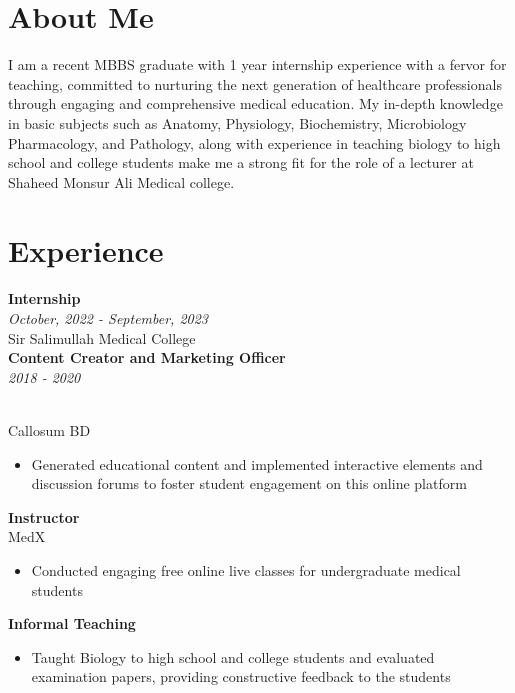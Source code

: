 \documentclass[a4paper,11pt]{article}
\newcommand{\resumeentry}[2]{
    \textbf{#1} \\
    \textit{#2}
}
\begin{document}
\begin{minipage}[t][12cm]{0.33\textwidth}
\end{minipage}
\hspace{1cm}
\begin{minipage}[t][12cm]{0.6\textwidth}
\section*{About Me}
  I am a recent MBBS graduate with 1 year internship experience with a fervor for teaching, committed to nurturing the next generation of healthcare professionals through engaging and comprehensive medical education. My in-depth knowledge in basic subjects such as Anatomy, Physiology, Biochemistry, Microbiology Pharmacology, and Pathology, along with experience in teaching biology to high school and college students make me a strong fit for the role of a lecturer at Shaheed Monsur Ali Medical college.
\\
\section*{Experience}
\raggedright
\resumeentry{Internship}{October, 2022 - September, 2023}\\ Sir Salimullah Medical College \vspace{0.2cm}\\
\resumeentry{Content Creator and Marketing Officer}{2018 - 2020}
\\ Callosum BD
\begin{itemize}[left=0em, topsep=0pt, itemsep=0pt, parsep=0pt]
  \item Generated educational content and implemented interactive elements and discussion forums to foster student engagement on this online platform 
\end{itemize} \vspace{2mm}
\textbf{Instructor}\\ MedX
\begin{itemize}[left=0em, topsep=0pt, itemsep=0pt, parsep=0pt]
  \item Conducted engaging free online live classes for undergraduate medical students 
\end{itemize} \vspace{2mm}
\textbf{Informal Teaching}
\begin{itemize}[left=0em, topsep=0pt, itemsep=0pt, parsep=0pt]
  \item Taught Biology to high school and college students and evaluated examination papers, providing constructive feedback to the students
\end{itemize}
\end{minipage}
\end{document}
